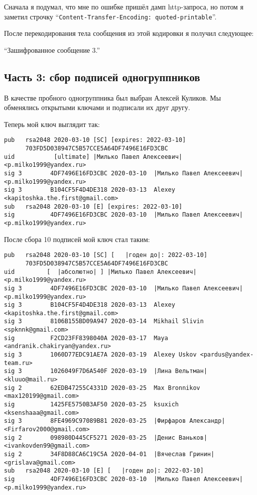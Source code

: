 \documentclass[12pt]{article}
\newcommand{\pa}[1]{\subsection*{\bf #1}}
\newcommand{\printPlain}[1]{\smallbreak{\large \bf  #1}
	{\scriptsize
		\setlength{\parindent}{0pt}
		
	}
}
\begin{document}
\printPlain{t3/decrypted.txt}

Сначала я подумал, что мне по ошибке пришёл дамп http-запроса, но потом я заметил строчку ``\lstinline|Content-Transfer-Encoding: quoted-printable|''.

После перекодирования тела сообщения из этой кодировки я получил следующее:

``Зашифрованное сообщение 3.''

\pa{Часть 3: сбор подписей одногруппников}

В качестве пробного одногруппника был выбран Алексей Куликов. Мы обменялись открытыми ключами и подписали их друг другу.

Теперь мой ключ выглядит так:
{
\scriptsize
\begin{lstlisting}[escapechar=|,breaklines=true]
pub   rsa2048 2020-03-10 [SC] [expires: 2022-03-10]
      703FD5D038947C5B57CCE5A64DF7496E16FD3CBC
uid           [ultimate] |Милько Павел Алексеевич| <p.milko1999@yandex.ru>
sig 3        4DF7496E16FD3CBC 2020-03-10  |Милько Павел Алексеевич| <p.milko1999@yandex.ru>
sig 3        B104CF5F4D4DE318 2020-03-13  Alexey <kapitoshka.the.first@gmail.com>
sub   rsa2048 2020-03-10 [E] [expires: 2022-03-10]
sig          4DF7496E16FD3CBC 2020-03-10  |Милько Павел Алексеевич| <p.milko1999@yandex.ru>
\end{lstlisting}
}

После сбора 10 подписей мой ключ стал таким:
{
\scriptsize
\begin{lstlisting}[escapechar=|,breaklines=true]
pub   rsa2048 2020-03-10 [SC] [   |годен до|: 2022-03-10]
      703FD5D038947C5B57CCE5A64DF7496E16FD3CBC
uid         [  |абсолютно| ] |Милько Павел Алексеевич| <p.milko1999@yandex.ru>
sig 3        4DF7496E16FD3CBC 2020-03-10  |Милько Павел Алексеевич| <p.milko1999@yandex.ru>
sig 3        B104CF5F4D4DE318 2020-03-13  Alexey <kapitoshka.the.first@gmail.com>
sig 3        8106B155BD09A947 2020-03-14  Mikhail Slivin <spknnk@gmail.com>
sig          F2CD23FF8398040A 2020-03-17  Maya <andranik.chakiryan@yandex.ru>
sig 3        1060D77EDC91AE7A 2020-03-19  Alexey Uskov <pardus@yandex-team.ru>
sig 3        1026049F7D6A540F 2020-03-19  |Лина Вельтман| <kluuo@mail.ru>
sig 2        62EDB47255C4331D 2020-03-25  Max Bronnikov <max120199@gmail.com>
sig          1425FE5750B3AF50 2020-03-25  ksuxich <ksenshaaa@gmail.com>
sig 3        8FE4969C97089B81 2020-03-25  |Фирфаров Александр| <Firfarov2000@gmail.com>
sig 2        098980D445CF5271 2020-03-25  |Денис Ваньков| <ivankovden99@gmail.com>
sig 2        34F8D88CA6C19C5A 2020-04-01  |Вячеслав Гринин| <grislava@gmail.com>
sub   rsa2048 2020-03-10 [E] [   |годен до|: 2022-03-10]
sig          4DF7496E16FD3CBC 2020-03-10  |Милько Павел Алексеевич| <p.milko1999@yandex.ru>
\end{lstlisting}
}
\end{document}

